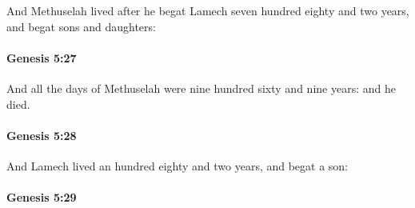 			And Methuselah lived after he begat Lamech seven hundred eighty and two years, and begat sons and daughters:


		\paragraph{Genesis 5:27} %
			\label{GENESIS-5-27}

			And all the days of Methuselah were nine hundred sixty and nine years: and he died.


		\paragraph{Genesis 5:28} %
			\label{GENESIS-5-28}

			And Lamech lived an hundred eighty and two years, and begat a son:


		\paragraph{Genesis 5:29} %
			\label{GENESIS-5-29}

